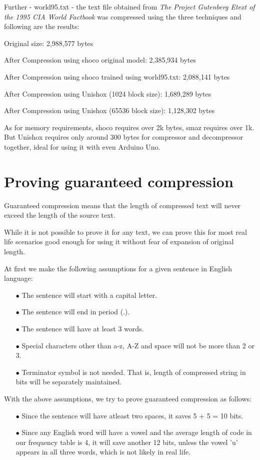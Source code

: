\documentclass[]{article}
\begin{document}
Further - world95.txt - the text file obtained from \emph{The Project Gutenberg Etext of the 1995 CIA World Factbook} was compressed using the three techniques and following are the results:

Original size: 2,988,577 bytes

After Compression using shoco original model: 2,385,934 bytes

After Compression using shoco trained using world95.txt: 2,088,141 bytes

After Compression using Unishox (1024 block size): 1,689,289 bytes

After Compression using Unishox (65536 block size): 1,128,302 bytes

As for memory requirements, shoco requires over 2k bytes, smaz requires over 1k. But Unishox requires only around $300$ bytes for compressor and decompressor together, ideal for using it with even Arduino Uno.

\section{Proving guaranteed compression}

Guaranteed compression means that the length of compressed text will never exceed the length of the source text.

While it is not possible to prove it for any text, we can prove this for most real life scenarios good enough for using it without fear of expansion of original length.

At first we make the following assumptions for a given sentence in English language:
\begin{itemize}
	\item[$\bullet$] The sentence will start with a capital letter.
	\item[$\bullet$] The sentence will end in period (.).
	\item[$\bullet$] The sentence will have at least 3 words.
	\item[$\bullet$] Special characters other than a-z, A-Z and space will not be more than 2 or 3.
	\item[$\bullet$] Terminator symbol is not needed. That is, length of compressed string in bits will be separately maintained.
\end{itemize}

With the above assumptions, we try to prove guaranteed compression as follows:

\begin{itemize}
	\item[$\bullet$] Since the sentence will have atleast two spaces, it saves 5 + 5 = 10 bits.
	\item[$\bullet$] Since any English word will have a vowel and the average length of code in our frequency table is 4, it will save another 12 bits, unless the vowel 'u' appears in all three words, which is not likely in real life.
\end{itemize}
\end{document}
